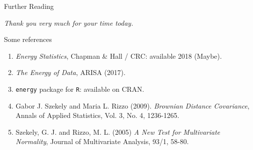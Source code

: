 \documentclass[presentation]{beamer}
\begin{document}
\begin{frame}{Further Reading}
  \begin{center}
    \textit{Thank you very much for your time today.}
  \end{center}

  \begin{block}{Some references}
    \begin{enumerate}
    \item \textit{Energy Statistics}, Chapman \&  Hall / CRC:
      available 2018 (Maybe).
    \item \textit{The Energy of Data}, ARISA (2017).
    \item \texttt{energy} package for \texttt{R}: available on CRAN.
    \item Gabor J. Szekely and Maria L. Rizzo (2009). \textit{Brownian Distance Covariance},
      Annals of Applied Statistics, Vol. 3, No. 4, 1236-1265. 
    \item Szekely, G. J. and Rizzo, M. L. (2005) \textit{A New Test for Multivariate Normality},
      Journal of Multivariate Analysis, 93/1, 58-80.
    \end{enumerate}
  \end{block}
\end{frame}
\end{document}
